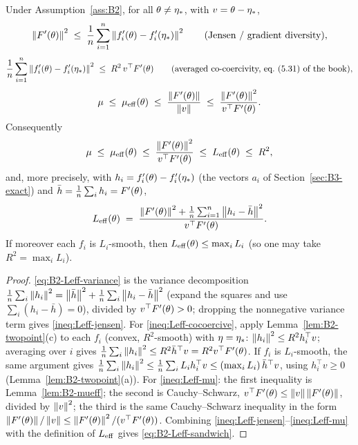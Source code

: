 \begin{lemma}\label{lem:B2-Leff}
Under Assumption~\ref{ass:B2}, for all $\theta\neq\eta_\ast$, with $v=\theta-\eta_\ast$,
\begin{equation}\label{ineq:Leff-jensen}
\left\|F'(\theta)\right\|^2\;\le\;\frac1n\sum_{i=1}^n\left\|f'_i(\theta)-f'_i(\eta_\ast)\right\|^2
\qquad\text{(Jensen / gradient diversity)},
\end{equation}
\begin{equation}\label{ineq:Leff-cocoercive}
\frac1n\sum_{i=1}^n\left\|f'_i(\theta)-f'_i(\eta_\ast)\right\|^2\;\le\;R^2\,v^\top F'(\theta)
\qquad\text{(averaged co-coercivity, eq.~(5.31) of the book)},
\end{equation}
\begin{equation}\label{ineq:Leff-mu}
\mu\;\le\;\mu_{\mathrm{eff}}(\theta)\;\le\;\frac{\left\|F'(\theta)\right\|}{\left\|v\right\|}\;\le\;\frac{\left\|F'(\theta)\right\|^2}{v^\top F'(\theta)} .
\end{equation}
Consequently
\begin{equation}\label{eq:B2-Leff-sandwich}
\mu\;\le\;\mu_{\mathrm{eff}}(\theta)\;\le\;\frac{\left\|F'(\theta)\right\|^2}{v^\top F'(\theta)}\;\le\;L_{\mathrm{eff}}(\theta)\;\le\;R^2 ,
\end{equation}
and, more precisely, with $h_i=f'_i(\theta)-f'_i(\eta_\ast)$ (the vectors $a_i$ of Section~\ref{sec:B3-exact}) and
$\bar h=\frac1n\sum_ih_i=F'(\theta)$,
\begin{equation}\label{eq:B2-Leff-variance}
L_{\mathrm{eff}}(\theta)\;=\;\frac{\left\|F'(\theta)\right\|^2+\frac1n\sum_{i=1}^n\left\|h_i-\bar h\right\|^2}{v^\top F'(\theta)} .
\end{equation}
If moreover each $f_i$ is $L_i$-smooth, then $L_{\mathrm{eff}}(\theta)\le\max_iL_i$ (so one may take $R^2=\max_iL_i$).
\end{lemma}

\begin{proof}
\eqref{eq:B2-Leff-variance} is the variance decomposition
$\frac1n\sum_i\left\|h_i\right\|^2=\left\|\bar h\right\|^2+\frac1n\sum_i\left\|h_i-\bar h\right\|^2$ (expand the squares and use
$\sum_i(h_i-\bar h)=0$), divided by $v^\top F'(\theta)>0$; dropping the nonnegative variance term gives
\eqref{ineq:Leff-jensen}. For \eqref{ineq:Leff-cocoercive}, apply Lemma~\ref{lem:B2-twopoint}(c) to each
$f_i$ (convex, $R^2$-smooth) with $\eta=\eta_\ast$: $\left\|h_i\right\|^2\le R^2h_i^\top v$; averaging over $i$ gives
$\frac1n\sum_i\left\|h_i\right\|^2\le R^2\bar h^\top v=R^2v^\top F'(\theta)$. If $f_i$ is $L_i$-smooth, the same
argument gives $\frac1n\sum_i\left\|h_i\right\|^2\le\frac1n\sum_iL_ih_i^\top v\le(\max_iL_i)\,\bar h^\top v$, using
$h_i^\top v\ge0$ (Lemma~\ref{lem:B2-twopoint}(a)). For \eqref{ineq:Leff-mu}: the first inequality is
Lemma~\ref{lem:B2-mueff}; the second is Cauchy--Schwarz, $v^\top F'(\theta)\le\left\|v\right\|\left\|F'(\theta)\right\|$,
divided by $\left\|v\right\|^2$; the third is the same Cauchy--Schwarz inequality in the form
$\left\|F'(\theta)\right\|/\left\|v\right\|\le\left\|F'(\theta)\right\|^2/(v^\top F'(\theta))$. Combining
\eqref{ineq:Leff-jensen}--\eqref{ineq:Leff-mu} with the definition of $L_{\mathrm{eff}}$ gives \eqref{eq:B2-Leff-sandwich}.
\end{proof}

